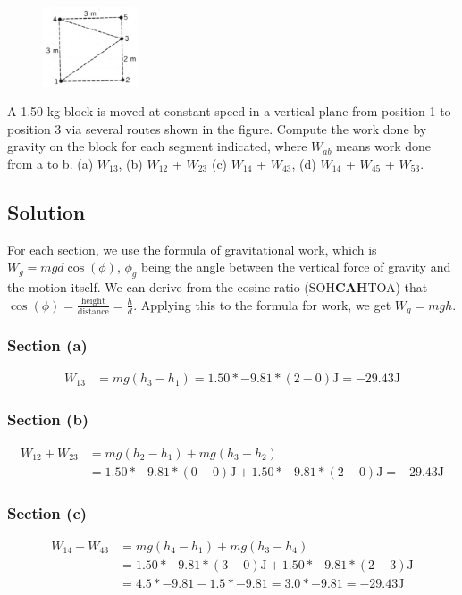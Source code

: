 \documentclass[12pt]{article}
\begin{document}
\begin{figure}
    \vspace{-25pt}
    \includegraphics[width=0.25\textwidth]{graph_4.png} 
\end{figure}
A 1.50-kg block is moved at constant speed in a vertical plane from position 1 to position 3 via several routes shown in the figure. Compute the work done by gravity on the block for each segment indicated, where $W_{ab}$ means work done from a to b. (a) $W_{13}$, (b) $W_{12}$ + $W_{23}$ (c) $W_{14}$ + $W_{43}$, (d) $W_{14}$ + $W_{45}$ + $W_{53}$.

\subsection*{Solution}
For each section, we use the formula of gravitational work, which is \( W_g = m g d \cos(\phi) \), $\phi_g$ being the angle between the vertical force of gravity and the motion itself. We can derive from the cosine ratio (SOH\textbf{CAH}TOA) that $\cos(\phi) = \frac{\text{height}}{\text{distance}} = \frac{h}{d}$. Applying this to the formula for work, we get $W_g = mgh$. 

\subsubsection*{Section (a)}
\begin{align*}
    W_{13}  &= mg(h_3 - h_1) 
            = 1.50 * -9.81 * (2 - 0) \unit{\joule} 
            = \boxed{ -29.43\unit{\joule} }
\end{align*}

\subsubsection*{Section (b)}
\begin{align*}
    W_{12} + W_{23} &= mg(h_2 - h_1) + mg(h_3 - h_2)\\
        &= 1.50 * -9.81 * (0 - 0) \unit{\joule} + 1.50 * -9.81 * (2 - 0) \unit{\joule} 
        = \boxed{ -29.43\unit{\joule} }
\end{align*}

\subsubsection*{Section (c)}
\begin{align*}
    W_{14} + W_{43} &= mg(h_4 - h_1) + mg(h_3 - h_4)\\
        &= 1.50 * -9.81 * (3 - 0) \unit{\joule} + 1.50 * -9.81 * (2 - 3) \unit{\joule}\\
        &= 4.5 * -9.81 - 1.5 * -9.81 = 3.0 * -9.81 
        = \boxed{ -29.43\unit{\joule} }
\end{align*}
\end{document}
